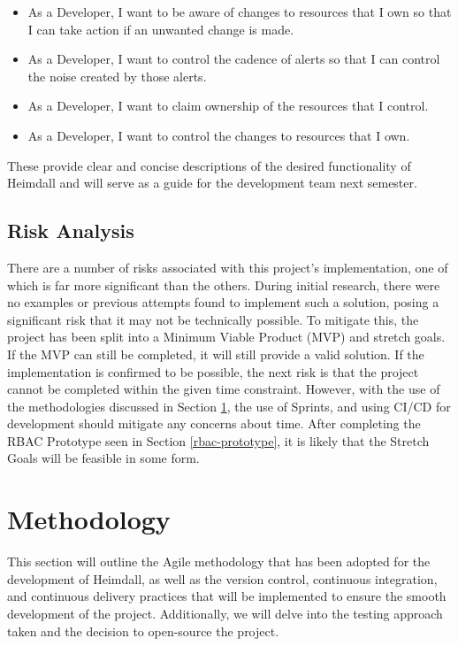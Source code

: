 \documentclass{article}
\begin{document}
\begin{itemize}
    \itemsep0em
    \item As a Developer, I want to be aware of changes to resources that I own so that I can take action if an unwanted change is made.
    \item As a Developer, I want to control the cadence of alerts so that I can control the noise created by those alerts.
    \item As a Developer, I want to claim ownership of the resources that I control.
    \item As a Developer, I want to control the changes to resources that I own.
\end{itemize}

These provide clear and concise descriptions of the desired functionality of Heimdall and will serve as a guide for the development team next semester.

\subsection{Risk Analysis}

There are a number of risks associated with this project's implementation, one of which is far more significant than the others. During initial research, there were no examples or previous attempts found to implement such a solution, posing a significant risk that it may not be technically possible. To mitigate this, the project has been split into a Minimum Viable Product (MVP) and stretch goals. If the MVP can still be completed, it will still provide a valid solution. If the implementation is confirmed to be possible, the next risk is that the project cannot be completed within the given time constraint. However, with the use of the methodologies discussed in Section \ref{methodology}, the use of Sprints, and using CI/CD for development should mitigate any concerns about time. After completing the RBAC Prototype seen in Section \ref{rbac-prototype}, it is likely that the Stretch Goals will be feasible in some form.


\section{Methodology} \label{methodology}

This section will outline the Agile methodology that has been adopted for the development of Heimdall, as well as the version control, continuous integration, and continuous delivery practices that will be implemented to ensure the smooth development of the project. Additionally, we will delve into the testing approach taken and the decision to open-source the project.
\end{document}
